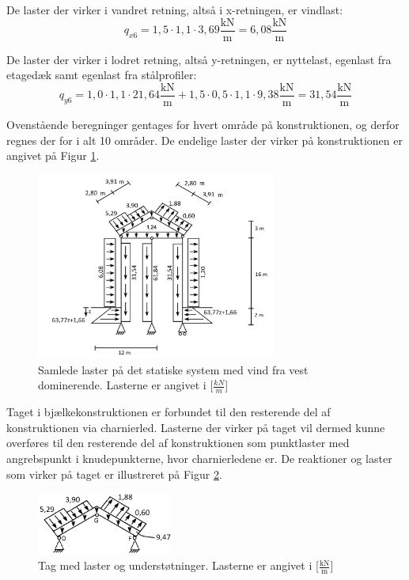 De laster der virker i vandret retning, altså i x-retningen, er vindlast:
\begin{equation}
	q_{x6} = 1,\!5 \cdot 1,\!1 \cdot 3,\!69 \frac{\text{kN}}{\text{m}} = 6,\!08 \frac{\text{kN}}{\text{m}}
\end{equation}

De laster der virker i lodret retning, altså y-retningen, er nyttelast, egenlast fra etagedæk samt egenlast fra stålprofiler:
\begin{equation}
	q_{y6} = 1,\!0 \cdot 1,\!1 \cdot 21,\!64 \frac{\text{kN}}{\text{m}} + 1,\!5 \cdot 0,\!5 \cdot 1,\!1 \cdot 9,\!38 \frac{\text{kN}}{\text{m}} = 31,\!54 \frac{\text{kN}}{\text{m}}
\end{equation}

Ovenstående beregninger gentages for hvert område på konstruktionen, og derfor regnes der for i alt 10 områder. De endelige laster der virker på konstruktionen er angivet på Figur \ref{fig:laster}. 

\begin{figure}[htbp]
	\centering
	\includegraphics[width=0.7\textwidth]{billeder/vdom.png}
	\caption{Samlede laster på det statiske system med vind fra vest dominerende. Lasterne er angivet i [$\frac{kN}{m}$]}
	\label{fig:laster}
\end{figure}

Taget i bjælkekonstruktionen er forbundet til den resterende del af konstruktionen via charnierled. Lasterne der virker på taget vil dermed kunne overføres til den resterende del af konstruktionen som punktlaster med angrebspunkt i knudepunkterne, hvor charnierledene er. De reaktioner og laster som virker på taget er illustreret på Figur \ref{fig:tagmedreaktioner}.

\begin{figure}[htbp]
	\centering
	\includegraphics[width=0.4\textwidth]{billeder/tagmedreaktioner.png}
	\caption{Tag med laster og understøtninger. Lasterne er angivet i [$\frac{\text{kN}}{\text{m}}$]}
	\label{fig:tagmedreaktioner}
\end{figure}

